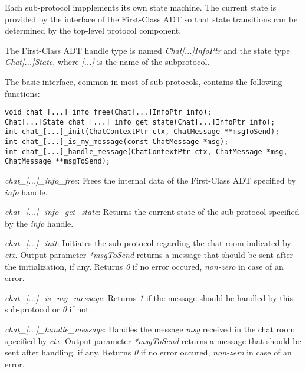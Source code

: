 Each sub-protocol impplements its own state machine. The current state is provided by the interface of the First-Class ADT so that state transitions can be determined by the top-level protocol component.

The First-Class ADT handle type is named \emph{Chat[...]InfoPtr} and the state type \emph{Chat[...]State}, where \emph{[...]} is the name of the subprotocol.

The basic interface, common in most of sub-protocols, contains the following functions:

\begin{lstlisting}[caption={General sub-protocol interface},label={lst:subprotocol-interface}]
void chat_[...]_info_free(Chat[...]InfoPtr info);
Chat[...]State chat_[...]_info_get_state(Chat[...]InfoPtr info);
int chat_[...]_init(ChatContextPtr ctx, ChatMessage **msgToSend);
int chat_[...]_is_my_message(const ChatMessage *msg);
int chat_[...]_handle_message(ChatContextPtr ctx, ChatMessage *msg, ChatMessage **msgToSend);
\end{lstlisting}

\begin{description}
  \item \emph{chat\_[...]\_info\_free}: Frees the internal data of the First-Class ADT specified by \emph{info} handle.

  \item \emph{chat\_[...]\_info\_get\_state}: Returns the current state of the sub-protocol specified by the \emph{info} handle.

  \item \emph{chat\_[...]\_init}: Initiates the sub-protocol regarding the chat room indicated by \emph{ctx}. Output parameter \emph{*msgToSend} returns a message that should be sent after the initialization, if any. Returns \emph{0} if no error occured, \emph{non-zero} in case of an error. 

  \item \emph{chat\_[...]\_is\_my\_message}: Returns \emph{1} if the message should be handled by this sub-protocol or \emph{0} if not.

  \item \emph{chat\_[...]\_handle\_message}: Handles the message \emph{msg} received in the chat room specified by \emph{ctx}. Output parameter \emph{*msgToSend} returns a message that should be sent after handling, if any. Returns \emph{0} if no error occured, \emph{non-zero} in case of an error. 
\end{description}

